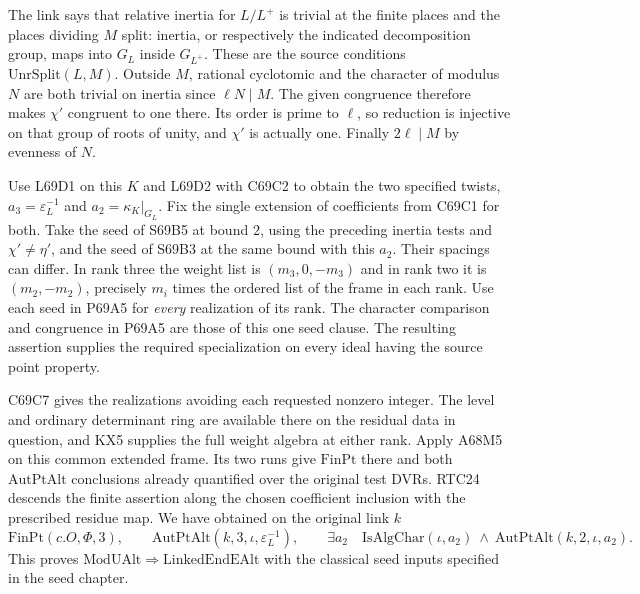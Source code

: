 The link says that relative inertia for $L/L^+$ is trivial at
the finite places and the places dividing $M$ split: inertia,
or respectively the indicated decomposition group, maps into
$G_L$ inside $G_{L^+}$. These are the source conditions
$\mathrm{UnrSplit}(L,M)$. Outside $M$, rational cyclotomic and
the character of modulus $N$ are both trivial on inertia since
$\ell N\mid M$. The given congruence therefore makes $\chi'$
congruent to one there. Its order is prime to $\ell$, so reduction
is injective on that group of roots of unity, and $\chi'$ is
actually one. Finally $2\ell\mid M$ by evenness of $N$.

Use L69D1 on this $K$ and L69D2 with C69C2 to obtain the two
specified twists, $a_3=\varepsilon_L^{-1}$ and
$a_2=\kappa_K|_{G_L}$. Fix the single extension of coefficients
from C69C1 for both. Take the seed of S69B5 at bound $2$, using
the preceding inertia tests and $\chi'\ne\eta'$, and the seed
of S69B3 at the same bound with this $a_2$. Their spacings can
differ. In rank three the weight list is $(m_3,0,-m_3)$ and in
rank two it is $(m_2,-m_2)$, precisely $m_i$ times the ordered
list of the frame in each rank. Use each seed in P69A5 for
\emph{every} realization of its rank. The character comparison
and congruence in P69A5 are those of this one seed clause.
The resulting assertion supplies the required specialization on
every ideal having the source point property.

C69C7 gives the realizations avoiding each requested nonzero
integer. The level and ordinary determinant ring are available
there on the residual data in question, and KX5 supplies the full
weight algebra at either rank. Apply A68M5 on this common extended
frame. Its two runs give $\mathrm{FinPt}$ there and both
$\mathrm{AutPtAlt}$ conclusions already quantified over the
original test DVRs. RTC24 descends the finite assertion along the
chosen coefficient inclusion with the prescribed residue map.
We have obtained on the original link $k$
\[
 \mathrm{FinPt}(c.O,\Phi,3),\qquad
 \mathrm{AutPtAlt}(k,3,\iota,\varepsilon_L^{-1}),\qquad
 \exists a_2\quad
 \mathrm{IsAlgChar}(\iota,a_2)\ \land\
 \mathrm{AutPtAlt}(k,2,\iota,a_2).
\]
This proves $\mathrm{ModUAlt}\Rightarrow\mathrm{LinkedEndEAlt}$
with the classical seed inputs specified in the seed chapter.

